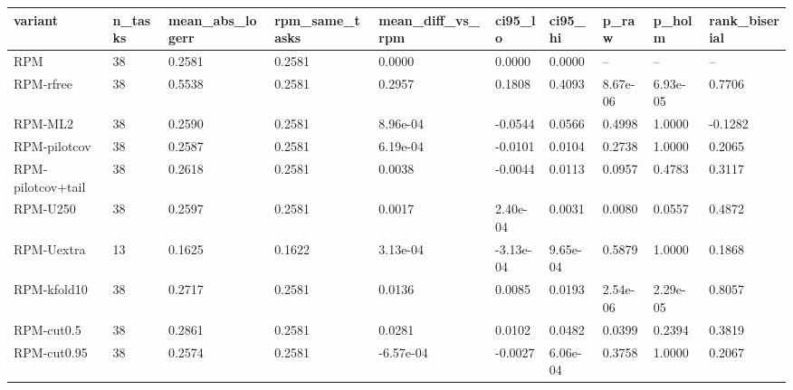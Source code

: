 \begin{tabular}{llllllllll}
\hline
variant & n\_tasks & mean\_abs\_logerr & rpm\_same\_tasks & mean\_diff\_vs\_rpm & ci95\_lo & ci95\_hi & p\_raw & p\_holm & rank\_biserial \\
\hline
RPM & 38 & 0.2581 & 0.2581 & 0.0000 & 0.0000 & 0.0000 & – & – & – \\
RPM-rfree & 38 & 0.5538 & 0.2581 & 0.2957 & 0.1808 & 0.4093 & 8.67e-06 & 6.93e-05 & 0.7706 \\
RPM-ML2 & 38 & 0.2590 & 0.2581 & 8.96e-04 & -0.0544 & 0.0566 & 0.4998 & 1.0000 & -0.1282 \\
RPM-pilotcov & 38 & 0.2587 & 0.2581 & 6.19e-04 & -0.0101 & 0.0104 & 0.2738 & 1.0000 & 0.2065 \\
RPM-pilotcov+tail & 38 & 0.2618 & 0.2581 & 0.0038 & -0.0044 & 0.0113 & 0.0957 & 0.4783 & 0.3117 \\
RPM-U250 & 38 & 0.2597 & 0.2581 & 0.0017 & 2.40e-04 & 0.0031 & 0.0080 & 0.0557 & 0.4872 \\
RPM-Uextra & 13 & 0.1625 & 0.1622 & 3.13e-04 & -3.13e-04 & 9.65e-04 & 0.5879 & 1.0000 & 0.1868 \\
RPM-kfold10 & 38 & 0.2717 & 0.2581 & 0.0136 & 0.0085 & 0.0193 & 2.54e-06 & 2.29e-05 & 0.8057 \\
RPM-cut0.5 & 38 & 0.2861 & 0.2581 & 0.0281 & 0.0102 & 0.0482 & 0.0399 & 0.2394 & 0.3819 \\
RPM-cut0.95 & 38 & 0.2574 & 0.2581 & -6.57e-04 & -0.0027 & 6.06e-04 & 0.3758 & 1.0000 & 0.2067 \\
\hline
\end{tabular}
